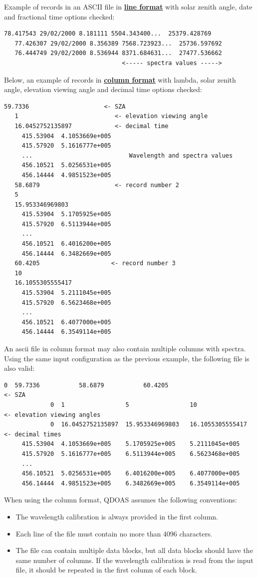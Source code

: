Example of records in an ASCII file in \underline{\textbf{line format}} with solar zenith angle, date and fractional time options checked:

\begin{Verbatim}[fontfamily=courier,fontsize=\relsize{-2}]
   78.417543 29/02/2000 8.181111 5504.343400...  25379.428769
   77.426307 29/02/2000 8.356389 7568.723923...  25736.597692
   76.444749 29/02/2000 8.536944 8371.684631...  27477.536662
                                 <----- spectra values ----->
\end{Verbatim}

Below, an example of records in \underline{\textbf{column format}} with lambda, solar zenith angle, elevation viewing angle and decimal time options checked:

\begin{Verbatim}[fontfamily=courier,fontsize=\relsize{-2}]
   59.7336                     <- SZA
   1                           <- elevation viewing angle
   16.0452752135897            <- decimal time
     415.53904  4.1053669e+005
     415.57920  5.1616777e+005
     ...                           Wavelength and spectra values
     456.10521  5.0256531e+005
     456.14444  4.9851523e+005
   58.6879                     <- record number 2
   5
   15.953346969803
     415.53904  5.1705925e+005
     415.57920  6.5113944e+005
     ...
     456.10521  6.4016200e+005
     456.14444  6.3482669e+005
   60.4205                    <- record number 3
   10
   16.1055305555417
     415.53904  5.2111045e+005
     415.57920  6.5623468e+005
     ...
     456.10521  6.4077000e+005
     456.14444  6.3549114e+005
\end{Verbatim}
An ascii file in column format may also contain multiple columns with spectra.  Using the same input configuration as the previous example, the following file is also valid:

\begin{Verbatim}[fontfamily=courier,fontsize=\relsize{-2}]
             0  59.7336           58.6879           60.4205                              <- SZA
             0  1                 5                 10                                   <- elevation viewing angles
             0  16.0452752135897  15.953346969803   16.1055305555417                     <- decimal times
     415.53904  4.1053669e+005    5.1705925e+005    5.2111045e+005
     415.57920  5.1616777e+005    6.5113944e+005    6.5623468e+005
     ...
     456.10521  5.0256531e+005    6.4016200e+005    6.4077000e+005
     456.14444  4.9851523e+005    6.3482669e+005    6.3549114e+005
\end{Verbatim}
When using the column format, QDOAS assumes the following conventions:
\begin{itemize}
\item The wavelength calibration is always provided in the first column.
\item Each line of the file must contain no more than 4096 characters.
\item The file can contain multiple data blocks, but all data blocks should have the same number of columns.  If the wavelength calibration is read from the input file, it should be repeated in the first column of each block.
\end{itemize}

